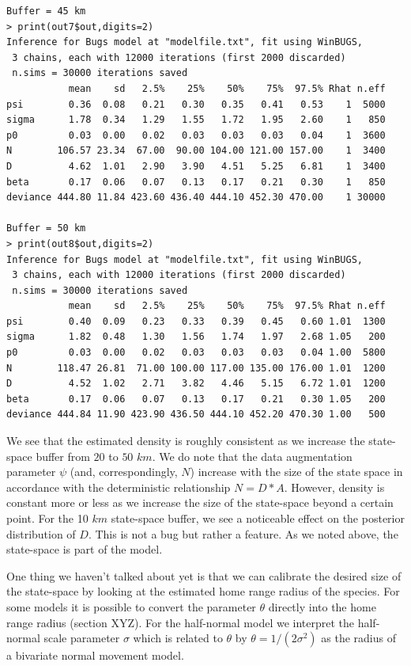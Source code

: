 {\begin{verbatim}
Buffer = 45 km
> print(out7$out,digits=2)
Inference for Bugs model at "modelfile.txt", fit using WinBUGS,
 3 chains, each with 12000 iterations (first 2000 discarded)
 n.sims = 30000 iterations saved
           mean    sd   2.5%    25%    50%    75%  97.5% Rhat n.eff
psi        0.36  0.08   0.21   0.30   0.35   0.41   0.53    1  5000
sigma      1.78  0.34   1.29   1.55   1.72   1.95   2.60    1   850
p0         0.03  0.00   0.02   0.03   0.03   0.03   0.04    1  3600
N        106.57 23.34  67.00  90.00 104.00 121.00 157.00    1  3400
D          4.62  1.01   2.90   3.90   4.51   5.25   6.81    1  3400
beta       0.17  0.06   0.07   0.13   0.17   0.21   0.30    1   850
deviance 444.80 11.84 423.60 436.40 444.10 452.30 470.00    1 30000

Buffer = 50 km
> print(out8$out,digits=2)
Inference for Bugs model at "modelfile.txt", fit using WinBUGS,
 3 chains, each with 12000 iterations (first 2000 discarded)
 n.sims = 30000 iterations saved
           mean    sd   2.5%    25%    50%    75%  97.5% Rhat n.eff
psi        0.40  0.09   0.23   0.33   0.39   0.45   0.60 1.01  1300
sigma      1.82  0.48   1.30   1.56   1.74   1.97   2.68 1.05   200
p0         0.03  0.00   0.02   0.03   0.03   0.03   0.04 1.00  5800
N        118.47 26.81  71.00 100.00 117.00 135.00 176.00 1.01  1200
D          4.52  1.02   2.71   3.82   4.46   5.15   6.72 1.01  1200
beta       0.17  0.06   0.07   0.13   0.17   0.21   0.30 1.05   200
deviance 444.84 11.90 423.90 436.50 444.10 452.20 470.30 1.00   500
\end{verbatim}
}

We see that the estimated density is roughly consistent as we increase
the state-space buffer from $20$ to $50$ $km$. We do note that the data
augmentation parameter $\psi$ (and, correspondingly, $N$) increase with
the size of the state space in accordance with the deterministic
relationship $N= D*A$. However, density is constant more or less as we
increase the size of the state-space beyond a certain point.  For the
10 $km$ state-space buffer, we see a noticeable effect on the posterior
distribution of $D$. This is not a bug but rather a feature. As we noted
above, the state-space is part of the model.

One thing we haven't talked about yet is that we can calibrate the
desired size of the state-space by looking at the estimated home range
radius of the species. For some models it is possible to convert the
parameter $\theta$ directly into the home range radius (section
XYZ). For the half-normal model we interpret the half-normal scale
parameter $\sigma$ which is related to $\theta$ by $\theta = 
1/(2\sigma^2)$ as the radius of a bivariate normal movement model.

